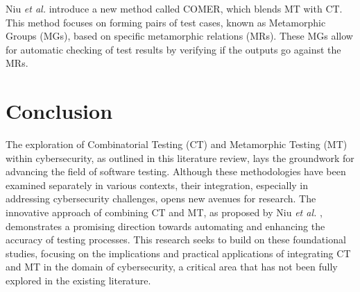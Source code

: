 Niu \textit{et al.} introduce a new method called COMER, which blends MT with CT. This method focuses on forming pairs of test cases, known as Metamorphic Groups (MGs), based on specific metamorphic relations (MRs). These MGs allow for automatic checking of test results by verifying if the outputs go against the MRs.

\section{Conclusion}

The exploration of Combinatorial Testing (CT) and Metamorphic Testing (MT) within cybersecurity, as outlined in this literature review, lays the groundwork for advancing the field of software testing. Although these methodologies have been examined separately in various contexts, their integration, especially in addressing cybersecurity challenges, opens new avenues for research. The innovative approach of combining CT and MT, as proposed by Niu \textit{et al.} \cite{comer}, demonstrates a promising direction towards automating and enhancing the accuracy of testing processes. This research seeks to build on these foundational studies, focusing on the implications and practical applications of integrating CT and MT in the domain of cybersecurity, a critical area that has not been fully explored in the existing literature.

\newpage



